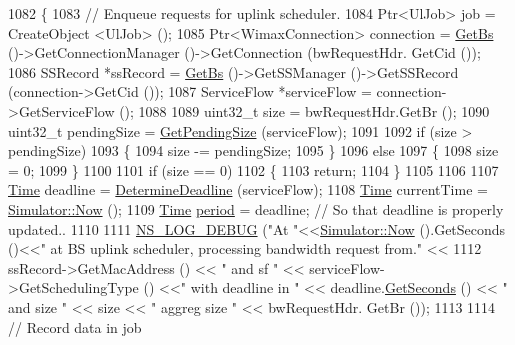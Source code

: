 \begin{DoxyCode}
1082 \{
1083   \textcolor{comment}{// Enqueue requests for uplink scheduler.}
1084   Ptr<UlJob> job = CreateObject <UlJob> ();
1085   Ptr<WimaxConnection> connection = \hyperlink{classns3_1_1UplinkScheduler_afe61b7de71d92d2dff1b135744a6ff7e}{GetBs} ()->GetConnectionManager ()->GetConnection (bwRequestHdr.
      GetCid ());
1086   SSRecord *ssRecord = \hyperlink{classns3_1_1UplinkScheduler_afe61b7de71d92d2dff1b135744a6ff7e}{GetBs} ()->GetSSManager ()->GetSSRecord (connection->GetCid ());
1087   ServiceFlow *serviceFlow = connection->GetServiceFlow ();
1088 
1089   uint32\_t size = bwRequestHdr.GetBr ();
1090   uint32\_t pendingSize = \hyperlink{classns3_1_1UplinkSchedulerMBQoS_acd81dfb3cabd98ee2f244df25e14558c}{GetPendingSize} (serviceFlow);
1091 
1092   \textcolor{keywordflow}{if} (size > pendingSize)
1093     \{
1094       size -= pendingSize;
1095     \}
1096   \textcolor{keywordflow}{else}
1097     \{
1098       size = 0;
1099     \}
1100 
1101   \textcolor{keywordflow}{if} (size == 0)
1102     \{
1103       \textcolor{keywordflow}{return};
1104     \}
1105 
1106 
1107   \hyperlink{namespacens3_1_1TracedValueCallback_a7ffd3e7c142ffe7c8a1d2db9b8de38ec}{Time} deadline = \hyperlink{classns3_1_1UplinkSchedulerMBQoS_adadb381ed6d228290bae257e4344d84d}{DetermineDeadline} (serviceFlow);
1108   \hyperlink{namespacens3_1_1TracedValueCallback_a7ffd3e7c142ffe7c8a1d2db9b8de38ec}{Time} currentTime = \hyperlink{classns3_1_1Simulator_ac3178fa975b419f7875e7105be122800}{Simulator::Now} ();
1109   \hyperlink{namespacens3_1_1TracedValueCallback_a7ffd3e7c142ffe7c8a1d2db9b8de38ec}{Time} \hyperlink{lte_2model_2fading-traces_2fading__trace__generator_8m_ae10c944bf9f3fba2686a5885ecc192d7}{period} = deadline; \textcolor{comment}{// So that deadline is properly updated..}
1110 
1111   \hyperlink{group__logging_ga413f1886406d49f59a6a0a89b77b4d0a}{NS\_LOG\_DEBUG} (\textcolor{stringliteral}{"At "}<<\hyperlink{classns3_1_1Simulator_ac3178fa975b419f7875e7105be122800}{Simulator::Now} ().GetSeconds ()<<\textcolor{stringliteral}{" at BS uplink scheduler,
       processing bandwidth request from."} <<
1112                 ssRecord->GetMacAddress () << \textcolor{stringliteral}{" and sf "} << serviceFlow->GetSchedulingType () <<\textcolor{stringliteral}{" with
       deadline in "} << deadline.\hyperlink{classns3_1_1Time_a8f20d5c3b0902d7b4320982f340b57c8}{GetSeconds} () << \textcolor{stringliteral}{" and size "} << size << \textcolor{stringliteral}{" aggreg size "} << bwRequestHdr.
      GetBr ());
1113 
1114   \textcolor{comment}{// Record data in job}

\end{DoxyCode}

